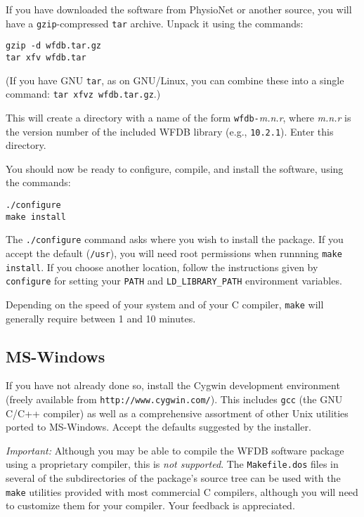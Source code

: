 \documentclass[twoside]{article}
\begin{document}
If you have downloaded the software from PhysioNet or another source, you
will have a {\tt gzip}-compressed {\tt tar} archive.  Unpack it using
the commands:

\begin{verbatim}
gzip -d wfdb.tar.gz
tar xfv wfdb.tar
\end{verbatim}

(If you have GNU {\tt tar}, as on GNU/Linux, you can combine these into a
single command: {\tt tar xfvz wfdb.tar.gz}.)

This will create a directory with a name of the form {\tt wfdb-}{\em m.n.r},
where {\em m.n.r} is the version number of the included WFDB library (e.g.,
{\tt 10.2.1}).  Enter this directory.

You should now be ready to configure, compile, and install the software, using
the commands:

\begin{verbatim}
./configure
make install
\end{verbatim}

The {\tt ./configure} command asks where you wish to install the package.
If you accept the default ({\tt /usr}), you will need root permissions when
runnning {\tt make install}.  If you choose another location, follow the
instructions given by {\tt configure} for setting your {\tt PATH} and
{\tt LD\_LIBRARY\_PATH} environment variables.

Depending on the speed of your system and of your C compiler, {\tt make} will
generally require between 1 and 10 minutes.

\subsection*{MS-Windows}

If you have not already done so, install the Cygwin development environment
(freely available from {\tt http://\-www.\-cygwin.\-com/}).  This includes
{\tt gcc} (the GNU C/C++ compiler) as well as a comprehensive assortment of
other Unix utilities ported to MS-Windows.  Accept the defaults suggested by
the installer.

\emph{Important:} Although you may be able to compile the WFDB software
package using a proprietary compiler, this is \emph{not supported}.  The
{\tt Makefile.dos} files in several of the subdirectories of the package's
source tree can be used with the {\tt make} utilities provided with most
commercial C compilers, although you will need to customize them for your
compiler. Your feedback is appreciated.
\end{document}
